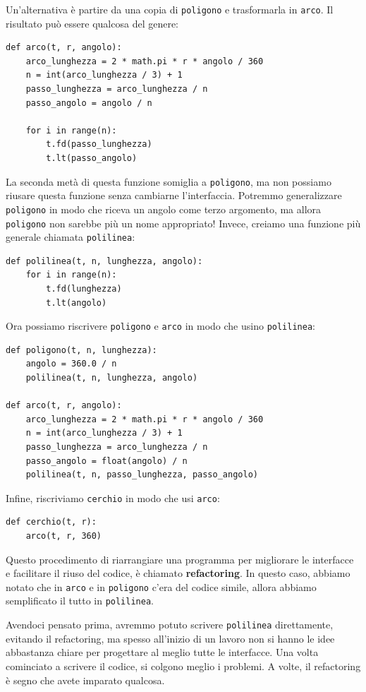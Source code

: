 \documentclass[10pt]{book}
\begin{document}
Un'alternativa è partire da una copia di {\tt poligono} e trasformarla in {\tt arco}. Il risultato può essere qualcosa del genere:

\begin{verbatim}
def arco(t, r, angolo):
    arco_lunghezza = 2 * math.pi * r * angolo / 360
    n = int(arco_lunghezza / 3) + 1
    passo_lunghezza = arco_lunghezza / n
    passo_angolo = angolo / n
    
    for i in range(n):
        t.fd(passo_lunghezza)
        t.lt(passo_angolo)
\end{verbatim}
%
La seconda metà di questa funzione somiglia a {\tt poligono}, ma non possiamo riusare questa funzione senza cambiarne l'interfaccia. Potremmo generalizzare {\tt poligono} in modo che riceva un angolo come terzo argomento, ma allora {\tt poligono} non sarebbe più un nome appropriato! Invece, creiamo una funzione più generale chiamata {\tt polilinea}:

\begin{verbatim}
def polilinea(t, n, lunghezza, angolo):
    for i in range(n):
        t.fd(lunghezza)
        t.lt(angolo)
\end{verbatim}
%
Ora possiamo riscrivere {\tt poligono} e {\tt arco} in modo che usino {\tt polilinea}:

\begin{verbatim}
def poligono(t, n, lunghezza):
    angolo = 360.0 / n
    polilinea(t, n, lunghezza, angolo)

def arco(t, r, angolo):
    arco_lunghezza = 2 * math.pi * r * angolo / 360
    n = int(arco_lunghezza / 3) + 1
    passo_lunghezza = arco_lunghezza / n
    passo_angolo = float(angolo) / n
    polilinea(t, n, passo_lunghezza, passo_angolo)
\end{verbatim}
%
Infine, riscriviamo {\tt cerchio} in modo che usi {\tt arco}:

\begin{verbatim}
def cerchio(t, r):
    arco(t, r, 360)
\end{verbatim}
%
Questo procedimento di riarrangiare una programma per migliorare le interfacce  e facilitare il riuso del codice, è chiamato {\bf refactoring}.
In questo caso, abbiamo notato che in {\tt arco} e in {\tt poligono} c'era del codice simile, allora abbiamo semplificato il tutto in {\tt polilinea}.

Avendoci pensato prima, avremmo potuto scrivere {\tt polilinea} direttamente, evitando il refactoring, ma spesso all'inizio di un lavoro non si hanno le idee abbastanza chiare per progettare al meglio tutte le interfacce. Una volta cominciato a scrivere il codice, si colgono meglio i problemi. A volte, il refactoring è segno che avete imparato qualcosa.
\end{document}
